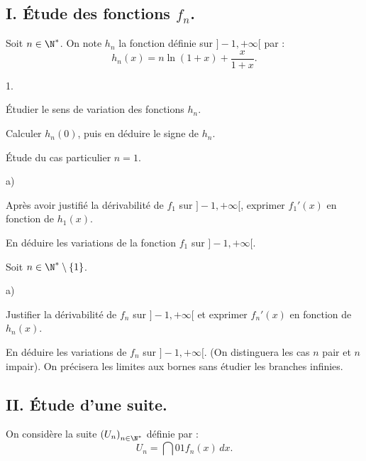 \documentclass[11pt]{article}%
\begin{document}
\subsection*{I. Étude des fonctions $f_{n}$.}

Soit $n\in \N^{\ast }$. On note $h_{n}$ la fonction définie sur $]-1, +
\infty \lbrack $ par : 
\[
h_{n}(x) = n\ln (1 + x) + \dfrac{x}{1 + x}.
\]

\begin{noliste}{1.}
 \setlength{\itemsep}{4mm}
\item Étudier le sens de variation des fonctions $h_{n}$.

\item Calculer $h_{n}(0)$, puis en déduire le signe de $h_{n}$.

\item Étude du cas particulier $n = 1$.

\begin{noliste}{a)}
 \setlength{\itemsep}{2mm}
\item Après avoir justifié la dérivabilité de $f_{1}$ sur $]-1, +
\infty
\lbrack $, exprimer $f_{1}{\prime }(x)$ en fonction de $h_{1}(x)$.

\item En déduire les variations de la fonction $f_{1}$ sur $]-1, +
\infty
\lbrack $.
\end{noliste}

\item Soit $n\in \N^{\ast }\setminus \{1\}$.

\begin{noliste}{a)}
 \setlength{\itemsep}{2mm}
\item Justifier la dérivabilité de $f_{n}$ sur $]-1, + \infty \lbrack $
et
exprimer $f_{n}{\prime }(x)$ en fonction de $h_{n}(x)$.

\item En déduire les variations de $f_{n}$ sur $]-1, + \infty \lbrack
$. (On
distinguera les cas $n$ pair et $n$ impair). On précisera les limites
aux
bornes sans étudier les branches infinies.
\end{noliste}
\end{noliste}

\subsection*{II. Étude d'une suite.}

On considère la suite $\left( U_{n}\right)_{n\in \N^{\ast }}$ définie
par : 
\[
U_{n} = \dint{0}{1}f_{n}(x)\,dx.
\]
\end{document}
